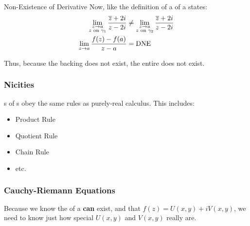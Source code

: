 \begin{example}[Lecture 5]{Non-Existence of Derivative}
  Now, like the definition of a  of a  states:
  \begin{align*}
    \lim\limits_{\substack{z \to a \\ z \text{ on } \gamma_{1}}} \frac{\overline{z} + 2i}{z - 2i} &\neq \lim\limits_{\substack{z \to a \\ z \text{ on } \gamma_{2}}} \frac{\overline{z} + 2i}{z - 2i} \\
    \lim\limits_{z \to a} \frac{f(z) - f(a)}{z - a} &= \mathrm{DNE}
  \end{align*}

  Thus, because the backing  does not exist, the entire  does not exist.
\end{example}

\subsubsection{Nicities}\label{subsubsec:Complex_Derivative_Nicities}
s of s obey the same rules as purely-real calculus.
This includes:
\begin{itemize}[noitemsep]
\item Product Rule
\item Quotient Rule
\item Chain Rule
\item etc.
\end{itemize}

\subsubsection{Cauchy-Riemann Equations}\label{subsubsec:Cauchy_Riemann_Equations}
Because we know the  of a  \textbf{can} exist, and that $f(z) = U(x, y) + i V(x, y)$, we need to know just how special $U(x, y)$ and $V(x, y)$ really are.

